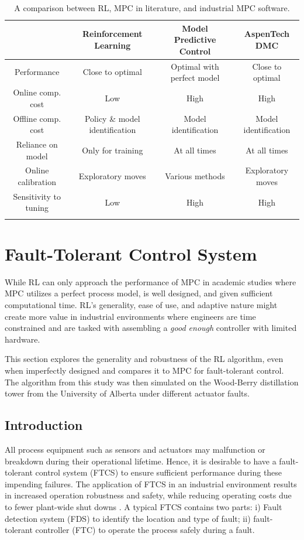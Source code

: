 \begin{table}[H]
\caption{A comparison between RL, MPC in literature, and industrial MPC software.}
\centering
{\scriptsize
\begin{tabular}{c|c|c|c}
& \textbf{Reinforcement Learning}	& \textbf{Model Predictive Control} & \textbf{AspenTech DMC}\\
\hline
Performance             & Close to optimal			& Optimal with perfect model   &  Close to optimal \\
Online comp. cost		& Low			& High   &  High \\
Offline comp. cost		& Policy \& model identification			& Model identification   &  Model identification \\
Reliance on model         	& Only for training			& At all times   &  At all times \\
Online calibration		& Exploratory moves			&  Various methods   &  Exploratory moves \\
Sensitivity to tuning   & Low			& High   &  High \\
\label{tab:rl_mpc_dmc}
\end{tabular}}
\end{table}

%
%
% 
%  
% 
% 
% 

\section{Fault-Tolerant Control System}
While RL can only approach the performance of MPC in academic studies where MPC utilizes a perfect process model, is well designed, and given sufficient computational time.  RL's generality, ease of use, and adaptive nature might create more value in industrial environments where engineers are time constrained and are tasked with assembling a \textit{good enough} controller with limited hardware.

This section explores the generality and robustness of the RL algorithm, even when imperfectly designed and compares it to MPC for fault-tolerant control.  The algorithm from this study was then simulated on the Wood-Berry distillation tower from the University of Alberta under different actuator faults.

\subsection{Introduction}
All process equipment such as sensors and actuators may malfunction or breakdown during their operational lifetime. Hence, it is desirable to have a fault-tolerant control system (FTCS) to ensure sufficient performance during these impending failures. The application of FTCS in an industrial environment results in increased operation robustness and safety, while reducing operating costs due to fewer plant-wide shut downs \cite{ftc_book_ref1}. A typical FTCS contains two parts: i) Fault detection system (FDS) to identify the location and type of fault; ii) fault-tolerant controller (FTC) to operate the process safely during a fault.

